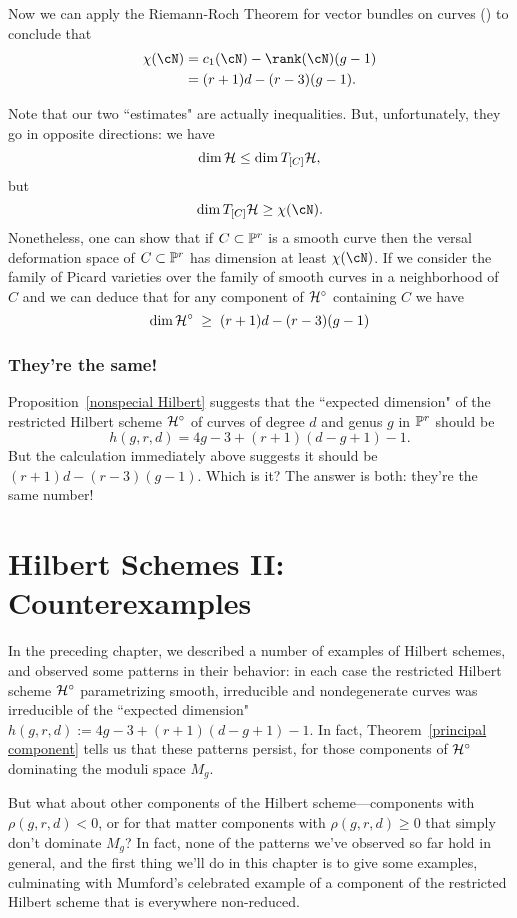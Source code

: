 Now we can apply the Riemann-Roch Theorem for vector bundles on curves (\cite[Theorem ???]{3264}) to conclude that
\begin{align*}
\chi(\cN) &= c_1(\cN) - \rank(\cN)(g-1) \\
&= (r+1)d - (r-3)(g-1).
\end{align*}

Note that our two ``estimates" are actually inequalities. But, unfortunately, they go in opposite directions: we have
$$
\dim \cH \leq \dim T_{[C]}\cH,
$$
but 
$$
\dim T_{[C]}\cH \geq \chi(\cN).
$$
Nonetheless, one can show that if $C \subset \PP^r$ is a smooth curve then the versal deformation space of $C \subset \PP^r$ has dimension at least $\chi(\cN)$. If we consider the family of Picard varieties over the family of smooth curves in a neighborhood of $C$ and we can deduce that for any component of $\cH^\circ$ containing $C$ we have
$$
\dim \cH^\circ \; \geq \; (r+1)d - (r-3)(g-1)
$$

\subsection{They're the same!} Proposition~\ref{nonspecial Hilbert} suggests that the ``expected dimension" of the restricted Hilbert scheme $\cH^\circ$ of curves of degree $d$ and genus $g$ in $\PP^r$ should be 
$$
h(g,r,d) = 4g-3 + (r+1)(d-g+1) - 1.
$$
But the calculation immediately above suggests it should be $(r+1)d - (r-3)(g-1)$. Which is it? The answer is both: they're the same number!

\chapter{Hilbert Schemes II: Counterexamples} 

In the preceding chapter, we described a number of examples of Hilbert schemes, and observed some patterns in their behavior: in each case the restricted Hilbert scheme $\cH^\circ$ parametrizing smooth, irreducible and nondegenerate curves was irreducible of the ``expected dimension" $h(g,r,d) :=  4g-3 + (r+1)(d-g+1) - 1$. In fact, Theorem~\ref{principal component} tells us that these patterns persist, for those components of $\cH^\circ$ dominating the moduli space $M_g$.

But what about other components of the Hilbert scheme---components with $\rho(g,r,d) < 0$, or for that matter components with $\rho(g,r,d) \geq 0$ that simply don't dominate $M_g$? In fact, none of the patterns we've observed so far hold in general, and the first thing we'll do in this chapter is to give some examples, culminating with Mumford's celebrated example of a component of the restricted Hilbert scheme that is everywhere non-reduced. 

